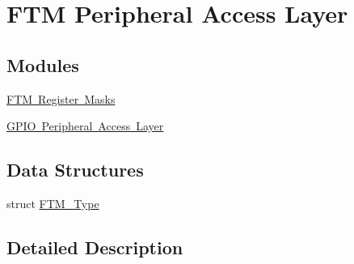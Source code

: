 \hypertarget{group___f_t_m___peripheral___access___layer}{}\section{F\+TM Peripheral Access Layer}
\label{group___f_t_m___peripheral___access___layer}
\subsection*{Modules}
\begin{DoxyCompactItemize}
\item 
\mbox{\hyperlink{group___f_t_m___register___masks}{F\+T\+M Register Masks}}
\item 
\mbox{\hyperlink{group___g_p_i_o___peripheral___access___layer}{G\+P\+I\+O Peripheral Access Layer}}
\end{DoxyCompactItemize}
\subsection*{Data Structures}
\begin{DoxyCompactItemize}
\item 
struct \mbox{\hyperlink{struct_f_t_m___type}{F\+T\+M\+\_\+\+Type}}
\end{DoxyCompactItemize}


\subsection{Detailed Description}
